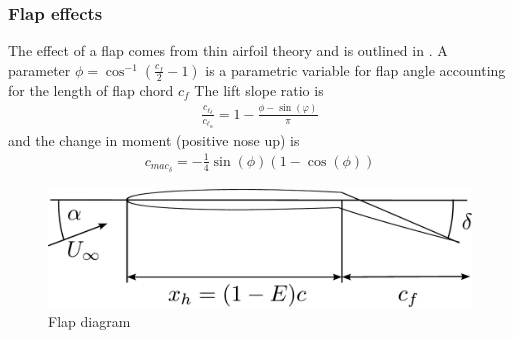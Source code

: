 \documentclass[10pt]{article}
\newcommand{\be}{\begin{eqnarray}}
\newcommand{\ee}{\end{eqnarray}}
\newcommand{\Uinf}{U_{\infty}}
\begin{document}
\subsubsection{Flap effects}
The effect of a flap comes from thin airfoil theory and is outlined in \citet{Glauert1924,Glauert1927}.
A parameter $\phi = \cos^{-1}\left(\frac{c_f}{2} -1\right)$ is a parametric variable for flap angle accounting for the length of flap chord $c_f$
The lift slope ratio is
\be
\frac{c_{\ell_\delta}}
{c_{\ell_\alpha}}
=
1 - \frac{\phi - \sin(\varphi)}{\pi}
\ee
and the change in moment (positive nose up) is
\be
c_{mac_{\delta}} = -\frac{1}{4}\sin(\phi) \left( 1 - \cos(\phi)\right)
\ee
\begin{figure}[htbp!]
    \centering
    \includegraphics[width=0.5\linewidth,clip,trim={0cm 0cm 0cm 0cm}]{FlapHydrofoil.pdf}
    \caption{\label{fig:Flap}
        Flap diagram
    }
\end{figure}
\end{document}
